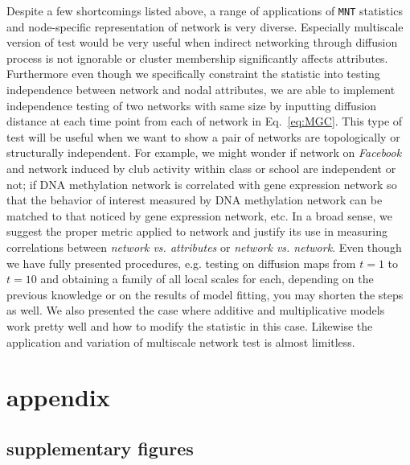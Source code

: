 \documentclass[12pt]{article}
\theoremstyle{definition}
\begin{document}
Despite a few shortcomings listed above, a range of applications of \texttt{MNT} statistics and node-specific representation of network is very diverse. Especially multiscale version of test would be very useful when indirect networking through diffusion process is not ignorable or cluster membership significantly affects attributes. Furthermore even though we specifically constraint the statistic into testing independence between network and nodal attributes, we are able to implement independence testing of two networks with same size by inputting diffusion distance at each time point from each of network in Eq.~\ref{eq:MGC}. This type of test will be useful when we want to show a pair of networks are topologically or structurally independent. For example, we might wonder if network on \textit{Facebook} and network induced by club activity within class or school are independent or not; if DNA methylation network is correlated with gene expression network \citep{bartlett2014dna} so that the behavior of interest measured by DNA methylation network can be matched to that noticed by gene expression network, etc.  In a broad sense, we suggest the proper metric applied to network and justify its use in measuring correlations between \textit{network vs. attributes} or \textit{network vs. network}. Even though we have fully presented procedures, e.g. testing on diffusion maps from $t=1$ to $t=10$  and obtaining a family of all local scales for each, depending on the previous knowledge or on the results of model fitting, you may shorten the steps as well. We also presented the case where additive and multiplicative models work pretty well and how to modify the statistic in this case. Likewise the application and variation of multiscale network test is almost limitless. 


 	
\appendix
\section{appendix}
\label{sec:appendix}
\subsection{supplementary figures}
\end{document}
